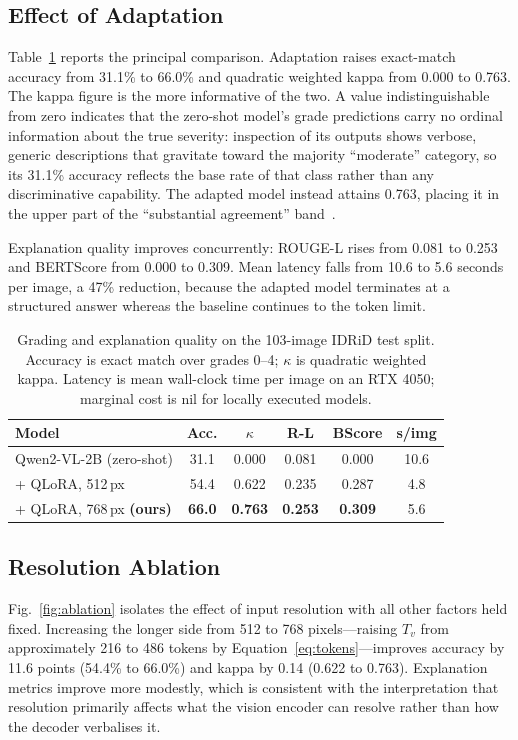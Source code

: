 \documentclass[conference]{IEEEtran}
\begin{document}
\subsection{Effect of Adaptation}
Table~\ref{tab:results} reports the principal comparison. Adaptation raises
exact-match accuracy from 31.1\% to 66.0\% and quadratic weighted kappa from
0.000 to 0.763. The kappa figure is the more informative of the two. A value
indistinguishable from zero indicates that the zero-shot model's grade
predictions carry no ordinal information about the true severity: inspection of
its outputs shows verbose, generic descriptions that gravitate toward the
majority ``moderate'' category, so its 31.1\% accuracy reflects the base rate of
that class rather than any discriminative capability. The adapted model instead
attains 0.763, placing it in the upper part of the ``substantial agreement''
band~\cite{landis1977measurement}.

Explanation quality improves concurrently: ROUGE-L rises from 0.081 to 0.253 and
BERTScore from 0.000 to 0.309. Mean latency falls from 10.6 to 5.6 seconds per
image, a 47\% reduction, because the adapted model terminates at a structured
answer whereas the baseline continues to the token limit.

\begin{table}[t]
\caption{Grading and explanation quality on the 103-image IDRiD test split.
Accuracy is exact match over grades 0--4; $\kappa$ is quadratic weighted kappa.
Latency is mean wall-clock time per image on an RTX 4050; marginal cost is nil
for locally executed models.}
\label{tab:results}
\centering
\small
\begin{tabular}{lccccc}
\toprule
\textbf{Model} & \textbf{Acc.} & \textbf{$\kappa$} & \textbf{R-L} &
\textbf{BScore} & \textbf{s/img} \\
\midrule
Qwen2-VL-2B (zero-shot) & 31.1 & 0.000 & 0.081 & 0.000 & 10.6 \\
\;+ QLoRA, 512\,px       & 54.4 & 0.622 & 0.235 & 0.287 & 4.8 \\
\;+ QLoRA, 768\,px \textbf{(ours)} & \textbf{66.0} & \textbf{0.763} &
\textbf{0.253} & \textbf{0.309} & 5.6 \\
\bottomrule
\end{tabular}
\end{table}

\subsection{Resolution Ablation}
Fig.~\ref{fig:ablation} isolates the effect of input resolution with all other
factors held fixed. Increasing the longer side from 512 to 768 pixels---raising
$T_v$ from approximately 216 to 486 tokens by
Equation~\eqref{eq:tokens}---improves accuracy by 11.6 points (54.4\% to 66.0\%)
and kappa by 0.14 (0.622 to 0.763). Explanation metrics improve more modestly,
which is consistent with the interpretation that resolution primarily affects
what the vision encoder can resolve rather than how the decoder verbalises it.
\end{document}
